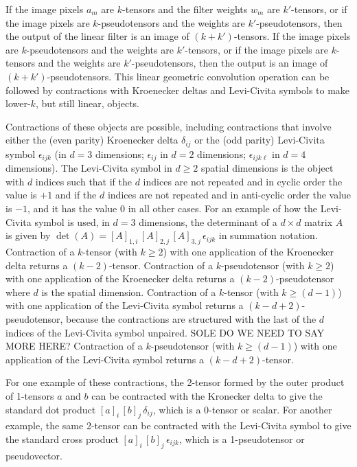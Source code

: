 \documentclass{article}
\theoremstyle{definition}
\begin{document}
If the image pixels $a_m$ are $k$-tensors and the filter weights $w_m$ are $k'$-tensors, or if the image pixels are $k$-pseudotensors and the weights are $k'$-pseudotensors, then the output of the linear filter is an image of $(k+k')$-tensors.
If the image pixels are $k$-pseudotensors and the weights are $k'$-tensors, or if the image pixels are $k$-tensors and the weights are $k'$-pseudotensors, then the output is an image of $(k+k')$-pseudotensors.
This linear geometric convolution operation can be followed by contractions with Kroenecker deltas and Levi-Civita symbols to make lower-$k$, but still linear, objects.

Contractions of these objects are possible, including contractions that involve either the (even parity) Kroenecker delta $\delta_{ij}$ or the (odd parity) Levi-Civita symbol $\epsilon_{ijk}$ (in $d=3$ dimensions; $\epsilon_{ij}$ in $d=2$ dimensions; $\epsilon_{ijk\ell}$ in $d=4$ dimensions).
The Levi-Civita symbol in $d\geq 2$ spatial dimensions is the object with $d$ indices such that if the $d$ indices are not repeated and in cyclic order the value is $+1$ and if the $d$ indices are not repeated and in anti-cyclic order the value is $-1$, and it has the value $0$ in all other cases.
For an example of how the Levi-Civita symbol is used, in $d=3$ dimensions, the determinant of a $d\times d$ matrix $A$ is given by $\det(A) = [A]_{1,i}\,[A]_{2,j}\,[A]_{3,j}\,\epsilon_{ijk}$ in summation notation.
Contraction of a $k$-tensor (with $k\geq 2$) with one application of the Kroenecker delta returns a $(k-2)$-tensor.
Contraction of a $k$-pseudotensor (with $k\geq 2$) with one application of the Kroenecker delta returns a $(k-2)$-pseudotensor where $d$ is the spatial dimension.
Contraction of a $k$-tensor (with $k\geq (d-1)$) with one application of the Levi-Civita symbol returns a $(k-d+2)$-pseudotensor, because the contractions are structured with the last of the $d$ indices of the Levi-Civita symbol unpaired. SOLE DO WE NEED TO SAY MORE HERE?
Contraction of a $k$-pseudotensor (with $k\geq (d-1)$) with one application of the Levi-Civita symbol returns a $(k-d+2)$-tensor.

For one example of these contractions, the 2-tensor formed by the outer product of 1-tensors $a$ and $b$ can be contracted with the Kronecker delta to give the standard dot product $[a]_i\,[b]_j\,\delta_{ij}$, which is a 0-tensor or scalar.
For another example, the same 2-tensor can be contracted with the Levi-Civita symbol to give the standard cross product
$[a]_i\,[b]_j\,\epsilon_{ijk}$, which is a 1-pseudotensor or pseudovector.
\end{document}

